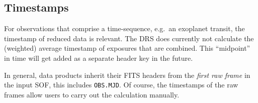 \subsection{Timestamps}
For observations that comprise a time-sequence, e.g.~an exoplanet transit,
the timestamp of reduced data is relevant. The DRS does currently not 
calculate the (weighted) average timestamp of exposures that are combined. This ``midpoint'' in time will get added as a separate header key in the future.

In general, data products inherit their FITS headers from the \emph{first raw frame} in the input SOF, this includes \texttt{OBS.MJD}. Of course, the timestamps of the raw frames allow users to carry out the calculation manually.